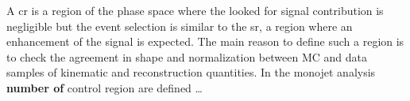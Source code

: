 A \gls{cr} is a region of the phase space where the looked for signal
contribution is negligible but the event selection is similar to the \gls{sr}, a
region where an enhancement of the signal is expected. The main reason to define
such a region is to check the agreement in shape and normalization between MC
and data samples of kinematic and reconstruction quantities. In the monojet
analysis \textbf{number of} control region are defined \dots
